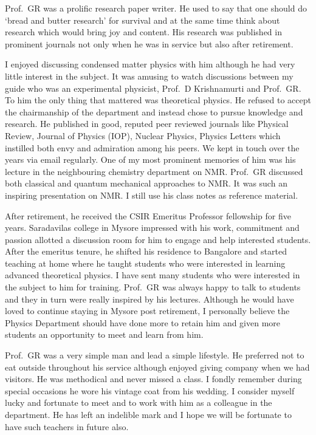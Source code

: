 Prof.\ GR was a prolific research paper writer. He used to say that one should do `bread and butter research' for survival and at the same time think about research which would bring joy and content. His research was published in prominent journals not only when he was in service but also after retirement.

I enjoyed discussing condensed matter physics with him although he had very little interest in the subject. It was
amusing to watch discussions between my guide who was an experimental physicist, Prof.\ D Krishnamurti and
Prof.\ GR. To him the only thing that mattered was theoretical physics. He refused to accept the chairmanship
of the department and instead chose to pursue knowledge and research. He published in good, reputed peer
reviewed journals like Physical Review, Journal of Physics (IOP), Nuclear Physics, Physics Letters which instilled
both envy and admiration among his peers. We kept in touch over the years via email regularly. One of my most prominent memories of him was his lecture in the neighbouring chemistry department on NMR. Prof.\ GR discussed 
both classical and quantum mechanical approaches to NMR. It was such an inspiring presentation on NMR. I still
use his class notes as reference material.

After retirement, he received the CSIR Emeritus Professor fellowship for five years. Saradavilas college in
Mysore impressed with his work, commitment and passion allotted a discussion room for him to engage and
help interested students. After the emeritus tenure, he shifted his residence to Bangalore and started teaching at
home where he taught students who were interested in learning advanced theoretical physics. I have sent many
students who were interested in the subject to him for training. Prof.\ GR was always happy to talk to students and
they in turn were really inspired by his lectures. Although he would have loved to continue staying in Mysore post
retirement, I personally believe the Physics Department should have done more to retain him and given more
students an opportunity to meet and learn from him.
\newpage

Prof.\ GR was a very simple man and lead a simple lifestyle. He preferred not to eat outside throughout his
service although enjoyed giving company when we had visitors. He was methodical and never missed a class. I
fondly remember during special occasions he wore his vintage coat from his wedding. I consider myself lucky and
fortunate to meet and to work with him as a colleague in the department. He has left an indelible mark and I
hope we will be fortunate to have such teachers in future also.
\vskip 2pt

